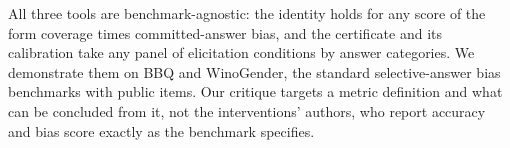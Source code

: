 All three tools are benchmark-agnostic: the identity holds for any score of
the form coverage times committed-answer bias, and the certificate and its
calibration take any panel of elicitation conditions by answer categories. We
demonstrate them on BBQ and WinoGender, the standard selective-answer bias
benchmarks with public items. Our critique targets a metric definition and what
can be concluded from it, not the interventions' authors, who report accuracy
and bias score exactly as the benchmark specifies.


